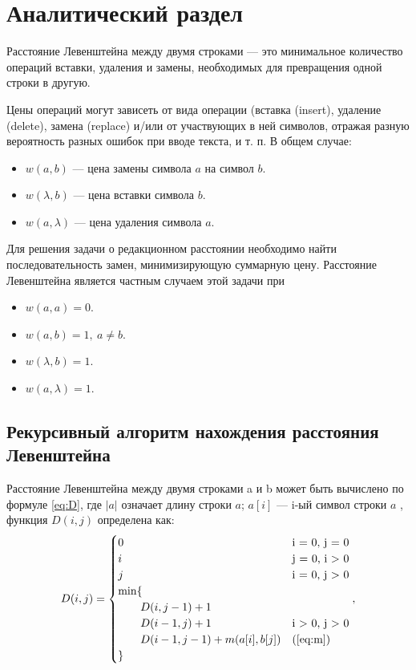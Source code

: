 \chapter{Аналитический раздел}\label{analyth}
Расстояние Левенштейна \cite{Levenshtein} между двумя строками — это минимальное количество операций вставки, удаления и замены, необходимых для превращения одной строки в другую.


Цены операций могут зависеть от вида операции (вставка (insert), удаление (delete), замена (replace) и/или от участвующих в ней символов, отражая разную вероятность разных ошибок при вводе текста, и т. п. В общем случае:

\begin{itemize}
	\item $w(a,b)$ — цена замены символа $a$ на символ $b$.
	\item $w(\lambda,b)$ — цена вставки символа $b$.
	\item $w(a,\lambda)$ — цена удаления символа $a$.
\end{itemize}

Для решения задачи о редакционном расстоянии необходимо найти последовательность замен, минимизирующую суммарную цену. Расстояние Левенштейна является частным случаем этой задачи при

\begin{itemize}
	\item $w(a,a)=0$.
	\item $w(a,b)=1, \medspace a \neq b$.
	\item $w(\lambda,b)=1$.
	\item $w(a,\lambda)=1$.
\end{itemize}

\section{Рекурсивный алгоритм нахождения расстояния Левенштейна}

Расстояние Левенштейна между двумя строками a и b может быть вычислено по формуле \ref{eq:D}, где $|a|$ означает длину строки $a$; $a[i]$ — i-ый символ строки $a$ , функция $D(i, j)$ определена как:
\begin{equation}
\label{eq:D}
D(i, j) = \begin{cases}
0 &\text{i = 0, j = 0}\\
i &\text{j = 0, i > 0}\\
j &\text{i = 0, j > 0}\\
\min \lbrace \\
\qquad D(i, j-1) + 1\\
\qquad D(i-1, j) + 1 &\text{i > 0, j > 0}\\
\qquad D(i-1, j-1) + m(a[i], b[j]) &\text(\ref{eq:m})\\
\rbrace
\end{cases},
\end{equation}

